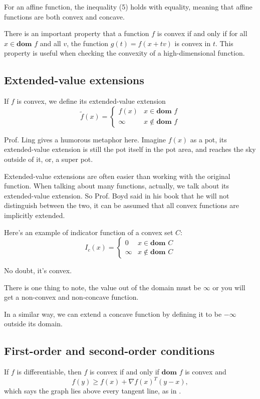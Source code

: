 \documentclass[lang=en,color=blue,mode=fancy,titlestyle=hang]{elegantbook}
\begin{document}
For an affine function, the inequality (5) holds with equality, meaning that affine
functions are both convex and concave.

There is an important property that a function $f$ is convex if and only if for all
$x \in \textbf{dom } f$ and all $v$, the function $g(t) = f(x + tv)$ is convex in $t$.
This property is useful when checking the convexity of a high-dimensional function.

\subsection{Extended-value extensions}

If $f$ is convex, we define its extended-value extension
\[
\tilde{f}(x) = \begin{cases}
f(x) & x \in \textbf{dom } f \\
\infty & x \notin \textbf{dom } f
\end{cases}
\]

Prof. Ling gives a humorous metaphor here. Imagine $f(x)$ as a pot, its extended-value
extension is still the pot itself in the pot area, and reaches the sky outside of it, or,
a super pot.

Extended-value extensions are often easier than working with the original function. When
talking about many functions, actually, we talk about its extended-value extension. So
Prof. Boyd said in his book that he will not distinguish between the two, it can be assumed
that all convex functions are implicitly extended.

Here's an example of indicator function of a convex set $C$:
\[
I_c(x) = \begin{cases}
0 & x \in \textbf{dom } C \\
\infty & x \notin \textbf{dom } C
\end{cases}
\]

No doubt, it's convex.

There is one thing to note, the value out of the domain must be $\infty$ or you will get
a non-convex and non-concave function.

In a similar way, we can extend a concave function by defining it to be $-\infty$ outside
its domain.

\subsection{First-order and second-order conditions}

If $f$ is differentiable, then $f$ is convex if and only if $\textbf{dom } f$ is convex and
\[
f(y) \geq f(x) + \nabla f(x)^T (y - x),
\]
which says the graph lies above every tangent line, as in .
\end{document}
